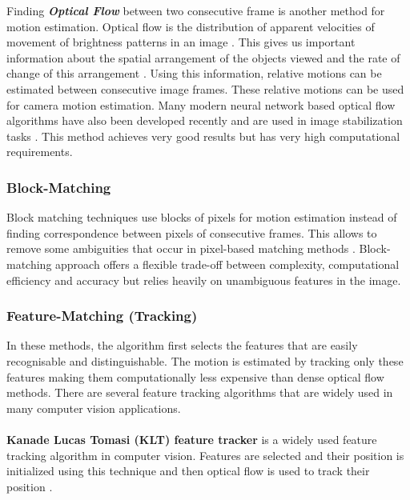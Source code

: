 Finding  \textbf{\textit{Optical Flow}} between two consecutive frame is another method for motion estimation. Optical flow is the distribution of apparent velocities of movement of brightness patterns in an image \citep{horn1981determining}. This gives us important information about the spatial arrangement of the objects viewed and the rate of change of this arrangement \citep{gibson1977analysis}. Using this information, relative motions can be estimated between consecutive image frames. These relative motions can be used for camera motion estimation. Many modern neural network based optical flow algorithms have also been developed recently and are used in image stabilization tasks \citep{deep_opti_stab}. This method achieves very good results but has very high computational requirements.

\subsubsection{Block-Matching}
Block matching techniques use blocks of pixels for motion estimation instead of finding correspondence between pixels of consecutive frames. This allows to remove some ambiguities that occur in pixel-based matching methods \citep{dis_review}. Block-matching approach offers a flexible trade-off between complexity, computational efficiency and accuracy \citep{dis_review} but relies heavily on unambiguous features in the image.

\subsubsection{Feature-Matching (Tracking)}
In these methods, the algorithm first selects the features that are easily recognisable and distinguishable. The motion is estimated by tracking only these features making them computationally less expensive than dense optical flow methods. There are several feature tracking algorithms that are widely used in many computer vision applications.

\paragraph{}\textbf{Kanade Lucas Tomasi (KLT) feature tracker} \citep{tomasi1991detection} is a widely used feature tracking algorithm in computer vision. Features are selected and their position is initialized using this technique and then optical flow is used to track their position \citep{dis_review}.

